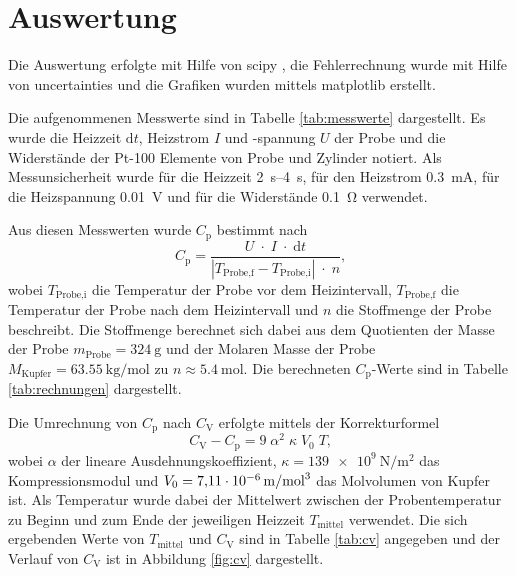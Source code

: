 \newpage
\section{Auswertung}
\label{sec:Auswertung}

Die Auswertung erfolgte mit Hilfe von scipy \cite{scipy},
die Fehlerrechnung wurde mit Hilfe von uncertainties \cite{uncertainties}
und die Grafiken wurden mittels matplotlib \cite{matplotlib} erstellt.

Die aufgenommenen Messwerte sind in Tabelle \ref{tab:messwerte}
dargestellt. Es wurde die Heizzeit $\text{d}t$, Heizstrom $I$ und -spannung $U$ der Probe und
die Widerstände der Pt-100 Elemente von Probe und Zylinder notiert. Als Messunsicherheit
wurde für die Heizzeit \SIrange{2}{4}{\second},
für den Heizstrom \SI{0.3}{\milli\ampere},
für die Heizspannung \SI{0.01}{\volt} und
für die Widerstände \SI{0.1}{\ohm} verwendet.


Aus diesen Messwerten wurde $C_\text{p}$ bestimmt nach
\begin{equation}
    C_\text{p} = \frac{U\;\cdot\;I\;\cdot\;\text{d}t}{|T_\text{Probe,f}-T_\text{Probe,i}|\;\cdot\;n}
    \text{,}
\end{equation}
wobei $T_\text{Probe,i}$ die Temperatur der Probe vor dem Heizintervall, $T_\text{Probe,f}$
die Temperatur der Probe nach dem Heizintervall und $n$ die Stoffmenge der Probe beschreibt.
Die Stoffmenge berechnet sich dabei aus dem Quotienten der Masse der Probe
$m_\text{Probe} = \SI{324}{\gram}$ \cite{anleitung} und der Molaren Masse der Probe
$M_\text{Kupfer} = \SI{63.55}{\kilo\gram\per\mole}$ \cite{lenntech} zu
$n \approx \SI{5.4}{\mole}$. Die berechneten $C_\text{p}$-Werte sind in Tabelle
\ref{tab:rechnungen} dargestellt.

Die Umrechnung von $C_\text{p}$ nach $C_\text{V}$ erfolgte mittels der Korrekturformel
\begin{equation}
    C_\text{V} - C_\text{p} = 9\;\alpha^2\;\kappa\;V_0\;T\text{,}
\end{equation}
wobei $\alpha$ der lineare Ausdehnungskoeffizient,
$\kappa = \SI{139e9}{\newton\per\meter\squared}$ \cite{demtroeder} das Kompressionsmodul
und $V_0 = \SI{7.11e-6}{\meter\raiseto{3}\per\mole}$ \cite{webelements} das Molvolumen
von Kupfer ist. Als Temperatur wurde dabei der Mittelwert zwischen der Probentemperatur
zu Beginn und zum Ende der jeweiligen Heizzeit $T_\text{mittel}$ verwendet.
Die sich ergebenden Werte von $T_\text{mittel}$ und $C_\text{V}$ sind in Tabelle
\ref{tab:cv} angegeben und der Verlauf von $C_\text{V}$ ist in Abbildung
\ref{fig:cv} dargestellt.

